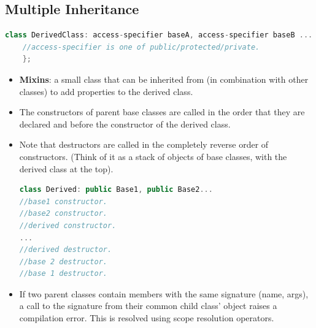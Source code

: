 \documentclass{report}
\begin{document}
\subsection{Multiple Inheritance}
\begin{lstlisting}[language=C++,caption=Syntax]
    class DerivedClass: access-specifier baseA, access-specifier baseB ... {
    //access-specifier is one of public/protected/private.
    };
\end{lstlisting}
\begin{itemize}
\item \textbf{Mixins}: a small class that can be inherited from (in combination with other classes) to add properties to the derived class.
\item The constructors of parent base classes are called in the order that they are declared and before the constructor of the derived class.
\item Note that destructors are called in the completely reverse order of constructors. (Think of it as a stack of objects of base classes, with the derived class at the top).
\begin{lstlisting}[language=C++]
class Derived: public Base1, public Base2...
//base1 constructor.
//base2 constructor.
//derived constructor.
...
//derived destructor.
//base 2 destructor.
//base 1 destructor.
\end{lstlisting}
\item If two parent classes contain members with the same signature (name, args), a call to the signature from their common child class' object raises a compilation error. This is resolved using scope resolution operators.
\end{itemize}
\end{document}
